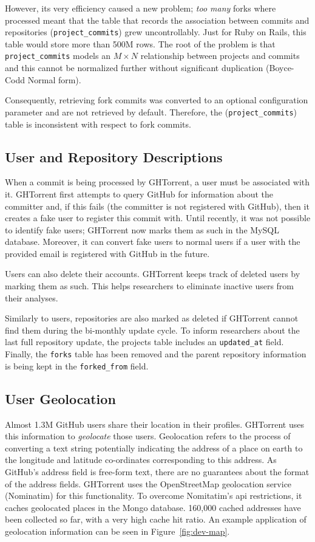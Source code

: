 \documentclass{sig-alternate}
\begin{document}
However, its very efficiency caused a new problem; \emph{too many} forks where
processed meant that the table that records the association between commits and
repositories (\texttt{project\_\-commits}) grew uncontrollably. Just for Ruby on
Rails, this table would store more than 500M rows. The root of the problem
is that \texttt{project\_commits} models an $M \times N$ relationship between
projects and commits and this cannot be normalized further without significant
duplication (Boyce-Codd Normal form).

Consequently, retrieving fork commits was converted to an optional
configuration parameter and are not retrieved by default. Therefore, the
(\texttt{project\_\-commits}) table is inconsistent with respect to
fork commits.

\subsection{User and Repository Descriptions}

When a commit is being processed by GHTorrent, a user must be associated with it.
GHTorrent first attempts to query GitHub for information about the committer
and, if this fails (the committer is not registered with GitHub), then it
creates a fake user to register this commit with. Until recently, it was not
possible to identify fake users; GHTorrent now marks them as such in the MySQL
database. Moreover, it can convert fake users to normal users if a user with
the provided email is registered with GitHub in the future.

Users can also delete their accounts.  GHTorrent keeps track of deleted users by
marking them as such. This helps researchers to eliminate inactive users from
their analyses.

Similarly to users, repositories are also marked as deleted if GHTorrent cannot
find them during the bi-monthly update cycle. To inform researchers about the
last full repository update, the projects table includes an \texttt{updated\_at}
field. Finally, the \texttt{forks} table has been removed and the parent
repository information is being kept in the \texttt{forked\_\-from} field.

\subsection{User Geolocation}

Almost 1.3M GitHub users share their location in their profiles. GHTorrent uses
this information to \emph{geolocate} those users. Geolocation refers to the
process of converting a text string potentially indicating the address of a
place on earth to the longitude and latitude co-ordinates corresponding to this
address. As GitHub's address field is free-form text, there are no guarantees
about the format of the address fields. GHTorrent uses the OpenStreetMap
geolocation service (Nominatim) for this functionality. To overcome Nomitatim's
{\sc api} restrictions, it caches geolocated places in the Mongo database. 160,000
cached addresses have been collected so far, with a very high cache hit ratio.
An example application of geolocation information can be seen in
Figure~\ref{fig:dev-map}.
\end{document}
